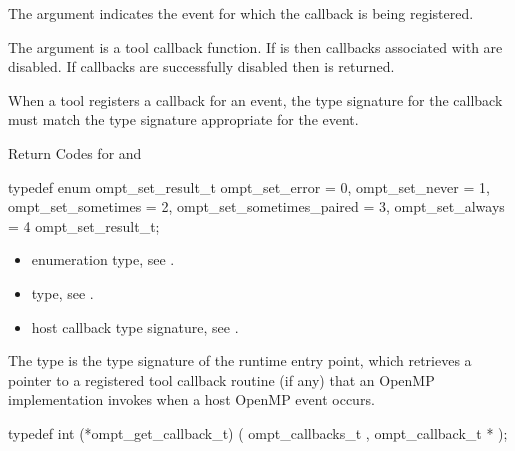 \argdesc
The  argument indicates the event for which the callback is 
being registered.

The  argument is a tool callback function. If 
is  then callbacks associated with  are disabled. If
callbacks are successfully disabled then  is returned.

\constraints
When a tool registers a callback for an event, the type signature for the 
callback must match the type signature appropriate for the event.

\begin{table}
\caption{Return Codes for  and
    \label{table:ToolsSupport_set_rc}}
\begin{omptEnum}
typedef enum ompt_set_result_t {
  ompt_set_error            = 0,
  ompt_set_never            = 1,
  ompt_set_sometimes        = 2,
  ompt_set_sometimes_paired = 3,
  ompt_set_always           = 4
} ompt_set_result_t;
\end{omptEnum}
\end{table}

\crossreferences
\begin{itemize}
\item {} enumeration type, see .

\item {} type, see .

\item {} host callback type signature,
see .
\end{itemize}



\label{sec:ompt_get_callback_t}
\label{sec:ompt_get_callback}

\summary
The  type is the type signature of the 
 runtime entry point, which retrieves a
pointer to a registered tool callback routine (if any) that an 
OpenMP implementation invokes when a host OpenMP event occurs.

\format
\begin{ccppspecific}
\begin{omptCallback}
typedef int (*ompt_get_callback_t) (
  ompt_callbacks_t ,
  ompt_callback_t *
);
\end{omptCallback}
\end{ccppspecific}


